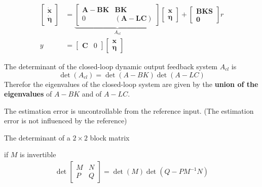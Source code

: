 \begin{align*}
    \begin{bmatrix}
        \dot{\mathbf{x}} \\
        \dot{\bm{\eta}}
    \end{bmatrix}
      & =
    \underbrace{
        \begin{bmatrix}
            \mathbf{A}-\mathbf{BK} & \mathbf{BK}              \\
            0                      & (\mathbf{A}-\mathbf{LC})
        \end{bmatrix}
    }_{A_{cl}}
    \begin{bmatrix}
        \mathbf{x} \\
        \bm{\eta}
    \end{bmatrix}
    +
    \begin{bmatrix}
        \mathbf{BKS} \\
        \mathbf{0}
    \end{bmatrix}
    r                    \\
    y & = \begin{bmatrix}
              \mathbf{C} & 0
          \end{bmatrix}
    \begin{bmatrix}
        \textbf{x} \\
        \bm{\eta}
    \end{bmatrix}
\end{align*}

The determinant of the closed-loop dynamic output feedback system $A_{cl}$ is
\begin{equation*}
    \det(A_{cl})=\det(A-BK)\det(A-LC)
\end{equation*}
Therefor the eigenvalues of the closed-loop system are given by the \textbf{union of the eigenvalues} of $A-BK$ and of $A-LC$.

\newpar{}

The estimation error is uncontrollable from the reference input. (The estimation error is not influenced by the reference)

\newpar{}

The determinant of a $2\times2$ block matrix

if $M$ is invertible
\begin{align*}
    \det\begin{bmatrix}
            M & N \\
            P & Q
        \end{bmatrix}
    = \det(M)\det(Q-PM^{-1}N)
\end{align*}

